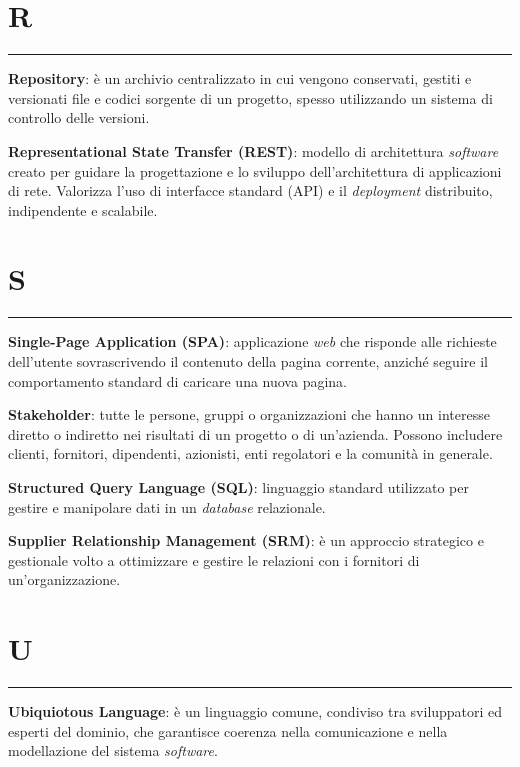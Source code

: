 \section*{R}
{\color{lightgray}\rule{\textwidth}{0.4pt}} %
\begin{glossaryitemize}
    \item \textbf{Repository}: è un archivio centralizzato in cui vengono conservati, gestiti e versionati file e codici sorgente di un progetto, spesso utilizzando un sistema di controllo delle versioni.
    \item \textbf{Representational State Transfer (REST)}: modello di architettura \textit{software} creato per guidare la progettazione e lo sviluppo dell’architettura di applicazioni di rete. Valorizza l’uso di interfacce standard (API) e il \textit{deployment} distribuito, indipendente e scalabile.
\end{glossaryitemize}

\section*{S}
{\color{lightgray}\rule{\textwidth}{0.4pt}} %
\begin{glossaryitemize}
    \item \textbf{Single-Page Application (SPA)}: applicazione \textit{web} che risponde alle richieste dell’utente sovrascrivendo il contenuto della pagina corrente, anziché seguire il comportamento standard di caricare una nuova pagina.
    \item \textbf{Stakeholder}: tutte le persone, gruppi o organizzazioni che hanno un interesse diretto o indiretto nei risultati di un progetto o di un'azienda. Possono includere clienti, fornitori, dipendenti, azionisti, enti regolatori e la comunità in generale.
    \item \textbf{Structured Query Language (SQL)}: linguaggio standard utilizzato per gestire e manipolare dati in un \textit{database} relazionale.
    \item \textbf{Supplier Relationship Management (SRM)}: è un approccio strategico e gestionale volto a ottimizzare e gestire le relazioni con i fornitori di un'organizzazione.
\end{glossaryitemize}

\section*{U}
{\color{lightgray}\rule{\textwidth}{0.4pt}} %
\begin{glossaryitemize}
    \item \textbf{Ubiquiotous Language}: è un linguaggio comune, condiviso tra sviluppatori ed esperti del dominio, che garantisce coerenza nella comunicazione e nella modellazione del sistema \textit{software}.
\end{glossaryitemize}

